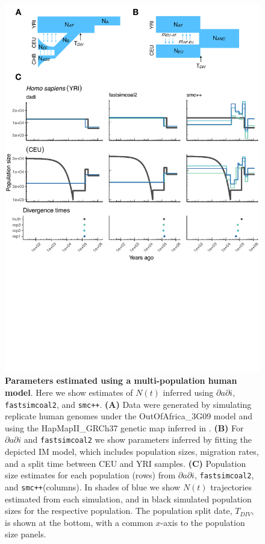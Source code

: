 \documentclass[12pt,halfline,a4paper]{ouparticle}
\newcommand{\dadi}{$\partial a \partial i$\xspace}
\newcommand{\smcpp}{\texttt{smc++}\xspace}
\newcommand{\fastsimcoal}{\texttt{fastsimcoal2}\xspace}
\begin{document}
\begin{figure}
\begin{center}
\includegraphics[width=0.7\linewidth]{display_items/homo_sapiens_two_pop_comp.pdf}
\caption{\textbf{Parameters estimated using a multi-population human model}.
Here we show estimates of $N(t)$ inferred using \dadi, \fastsimcoal, and \smcpp. \textbf{(A)} Data were generated by simulating
replicate human genomes under the OutOfAfrica\_3G09 model and using the HapMapII\_GRCh37 genetic map
inferred in \cite{international2007second}. \textbf{(B)} For \dadi and \fastsimcoal we show parameters inferred
by fitting the depicted IM model, which includes population sizes, migration rates, and a split
time between CEU and YRI samples. \textbf{(C)} Population size estimates for each population (rows)
from \dadi, \fastsimcoal, and \smcpp (columns).
In shades of blue we show $N(t)$ trajectories estimated from each simulation,
and in black simulated population sizes for the respective population.
The population split date, $T_{DIV}$, is shown at
the bottom, with a common $x$-axis to the population size panels.}
\label{fig:IM_popn_human}
\end{center}
\end{figure}
\end{document}
